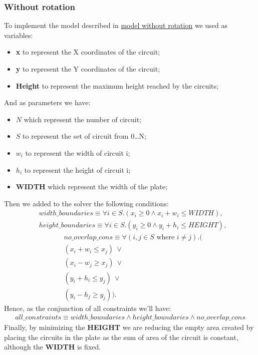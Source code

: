 \subsubsection{Without rotation}
To implement the model described in \hyperref[subsubsec:base-without-rot]{model without rotation} we used as variables: 
\begin{itemize}
    \item \textbf{x} to represent the X coordinates of the circuit;
    \item \textbf{y} to represent the Y coordinates of the circuit;
    \item \textbf{Height} to represent the maximum height reached by the circuits;
\end{itemize}
And as parameters we have:
\begin{itemize}
    \item \textbf{$N$} which represent the number of circuit;
    \item \textbf{$S$} to represent the set of circuit from 0\dots N;
    \item \textbf{$w_i$} to represent the width of circuit i;
    \item \textbf{$h_i$} to represent the height of circuit i;
    \item \textbf{WIDTH} which represent the width of the plate;
\end{itemize}
Then we added to the solver the following conditions: 
\begin{align}
    &width\_boundaries \equiv \forall{i \in  S}.(x_i \geq 0  \wedge  x_i + w_i \leq \textit{WIDTH}),\\
    &height\_boundaries \equiv \forall{i \in  S}.(y_i \geq 0  \wedge  y_i + h_i \leq \textit{HEIGHT}),
\end{align}
\begin{align}
   & no\_overlap\_cons \equiv \forall (i, j \in  S \text{ where } i \neq j).(\\
    &( x_i + w_i \leq x_j) \: \lor \\
    &( x_i - w_j \geq x_j) \: \lor \\
    &( y_i + h_i \leq y_j) \: \lor \\
    &(y_i - h_j \geq y_j)).
\end{align}
Hence, as the conjunction of all constraints we'll have: 
\begin{align}
    all\_constraints \equiv width\_boundaries \wedge height\_boundaries \wedge no\_overlap\_cons
\end{align}
Finally, by minimizing the \textbf{HEIGHT} we are reducing the empty area created by placing the circuits in the plate as the sum of area of the circuit is constant, although the \textbf{WIDTH} is fixed. 


